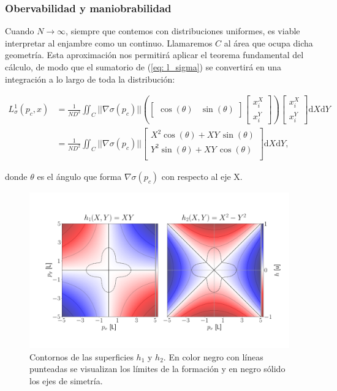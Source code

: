 \subsubsection{Obervabilidad y maniobrabilidad}

Cuando $N\to\infty$, siempre que contemos con distribuciones uniformes, es viable interpretar al enjambre como un continuo. Llamaremos $C$ al área que ocupa dicha geometría. Esta aproximación nos permitirá aplicar el teorema fundamental del cálculo, de modo que el sumatorio de (\ref{eq: l_sigma}) se convertirá en una integración a lo largo de toda la distribución:

\begin{align} \label{eq: l1_cont}
    L_\sigma^1(p_c, x) & = 
    \frac{1}{N D^2} \iint_C ||\nabla\sigma(p_c)|| \left(
    \begin{bmatrix}\cos(\theta) & \sin(\theta) \end{bmatrix} 
    \begin{bmatrix}x_i^X \\ x_i^Y \end{bmatrix}
    \right)
    \begin{bmatrix}x_i^X \\ x_i^Y \end{bmatrix} 
    \mathrm{d}X \mathrm{d}Y
    \nonumber\\
    & = \frac{1}{N D^2} \iint_C ||\nabla\sigma(p_c)||
    \begin{bmatrix}
        X^2 \cos(\theta) + XY\, \sin(\theta) \\
        Y^2 \sin(\theta) + XY\, \cos(\theta) \\
    \end{bmatrix}
    \mathrm{d}X \mathrm{d}Y,
\end{align}

donde $\theta$ es el ángulo que forma $\nabla\sigma(p_c)$ con respecto al eje X.

\begin{figure}[!h]
    \centering
    \includegraphics[trim={0 3.5cm 0 4cm}, clip, width=1\columnwidth]{./fig/xy_simetry.png}
    \caption{Contornos de las superficies $h_1$ y $h_2$. En color negro con líneas punteadas se visualizan los límites de la formación y en negro sólido los ejes de simetría.}
    \label{fig: xy_simetry}
\end{figure}

